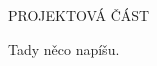 \begin{lefttextpipe}
	{\Large \MakeUppercase{} PROJEKTOVÁ ČÁST}
\end{lefttextpipe}

Tady něco napíšu.